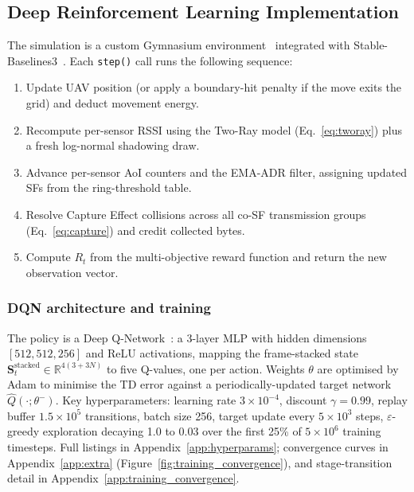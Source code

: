 \subsection{Deep Reinforcement Learning Implementation}
\label{sec:drl_impl}
\label{sec:training}

The simulation is a custom Gymnasium environment~\cite{towers2024gymnasium} integrated with Stable-Baselines3~\cite{raffin2021stable}. Each \texttt{step()} call runs the following sequence:
\begin{enumerate}
    \item Update UAV position (or apply a boundary-hit penalty if the move exits the grid) and deduct movement energy.
    \item Recompute per-sensor RSSI using the Two-Ray model (Eq.~\ref{eq:tworay}) plus a fresh log-normal shadowing draw.
    \item Advance per-sensor AoI counters and the EMA-ADR filter, assigning updated SFs from the ring-threshold table.
    \item Resolve Capture Effect collisions across all co-SF transmission groups (Eq.~\ref{eq:capture}) and credit collected bytes.
    \item Compute $R_t$ from the multi-objective reward function and return the new observation vector.
\end{enumerate}

\subsubsection{DQN architecture and training}

The policy is a Deep Q-Network~\cite{mnih2015humanlevel}: a 3-layer
MLP with hidden dimensions $[512, 512, 256]$ and ReLU activations,
mapping the frame-stacked state $\mathbf{S}_t^{\mathrm{stacked}}\in\mathbb{R}^{4(3+3N)}$
to five Q-values, one per action. Weights $\theta$ are optimised by
Adam to minimise the TD error against a periodically-updated target
network $\hat{Q}(\cdot;\theta^-)$. Key hyperparameters: learning rate
$3\times 10^{-4}$, discount $\gamma = 0.99$, replay buffer
$1.5\times 10^5$ transitions, batch size 256, target update every
$5\times 10^3$ steps, $\varepsilon$-greedy exploration decaying 1.0 to 0.03
over the first 25\% of $5\times 10^6$ training timesteps. Full
listings in Appendix~\ref{app:hyperparams}; convergence curves in
Appendix~\ref{app:extra} (Figure~\ref{fig:training_convergence}), and
stage-transition detail in Appendix~\ref{app:training_convergence}.

